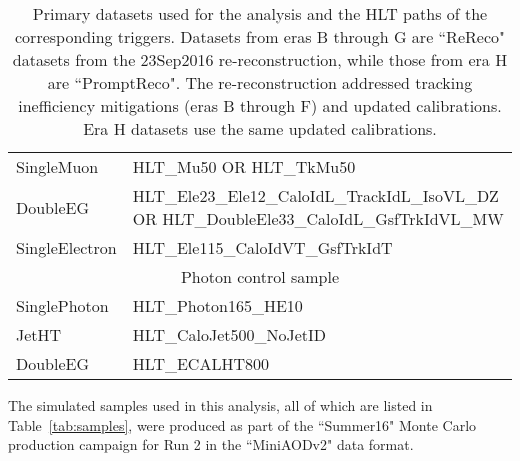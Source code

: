 \begin{table}[!ht]
\begin{center}
{\begin{tabular}{|l|l|}
SingleMuon & HLT\_Mu50 OR HLT\_TkMu50\\
DoubleEG & HLT\_Ele23\_Ele12\_CaloIdL\_TrackIdL\_IsoVL\_DZ OR HLT\_DoubleEle33\_CaloIdL\_GsfTrkIdVL\_MW \\
SingleElectron & HLT\_Ele115\_CaloIdVT\_GsfTrkIdT \\
\hline
\multicolumn{2}{|c|}{Photon control sample} \\
\hline
SinglePhoton & HLT\_Photon165\_HE10 \\
JetHT & HLT\_CaloJet500\_NoJetID \\
DoubleEG & HLT\_ECALHT800 \\
\hline
\end{tabular}
}
\end{center}
\caption{\label{tab:datasets}Primary datasets used for the analysis and the HLT paths of the corresponding triggers. Datasets from eras B through G are ``ReReco" datasets from the 23Sep2016 re-reconstruction, while those from era H are ``PromptReco". The re-reconstruction addressed tracking inefficiency mitigations (eras B through F) and updated calibrations. Era H datasets use the same updated calibrations.}
\end{table}

The simulated samples used in this analysis, all of which are listed in Table~\ref{tab:samples}, were produced as part of the ``Summer16" Monte Carlo production campaign for Run 2 in the ``MiniAODv2" data format.

